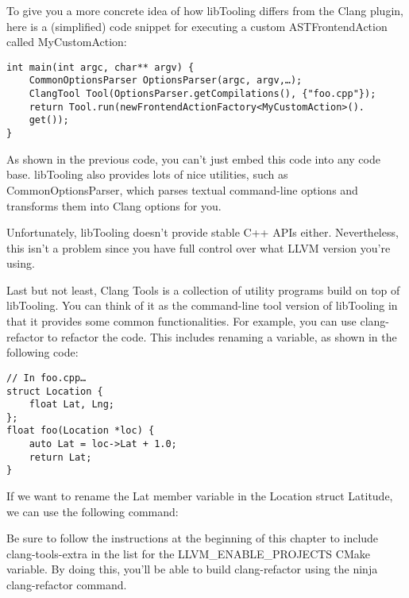 To give you a more concrete idea of how libTooling differs from the Clang plugin, here is a (simplified) code snippet for executing a custom ASTFrontendAction called MyCustomAction:

\begin{lstlisting}[style=styleCXX]
int main(int argc, char** argv) {
	CommonOptionsParser OptionsParser(argc, argv,…);
	ClangTool Tool(OptionsParser.getCompilations(), {"foo.cpp"});
	return Tool.run(newFrontendActionFactory<MyCustomAction>().
	get());
}
\end{lstlisting}

As shown in the previous code, you can't just embed this code into any code base. libTooling also provides lots of nice utilities, such as CommonOptionsParser, which parses textual command-line options and transforms them into Clang options for you.

\begin{tcolorbox}[colback=blue!5!white,colframe=blue!75!black, fonttitle=\bfseries,title=libTooling's API Stability]
\hspace*{0.7cm}Unfortunately, libTooling doesn't provide stable C++ APIs either. Nevertheless, this isn't a problem since you have full control over what LLVM version you're using.
\end{tcolorbox}

Last but not least, Clang Tools is a collection of utility programs build on top of libTooling. You can think of it as the command-line tool version of libTooling in that it provides some common functionalities. For example, you can use clang-refactor to refactor the code. This includes renaming a variable, as shown in the following code:

\begin{lstlisting}[style=styleCXX]
// In foo.cpp…
struct Location {
	float Lat, Lng;
};
float foo(Location *loc) {
	auto Lat = loc->Lat + 1.0;
	return Lat;
}
\end{lstlisting}

If we want to rename the Lat member variable in the Location struct Latitude, we can use the following command:


\begin{tcolorbox}[colback=blue!5!white,colframe=blue!75!black, fonttitle=\bfseries,title=Building clang-refactor]
\hspace*{0.7cm}Be sure to follow the instructions at the beginning of this chapter to include clang-tools-extra in the list for the LLVM\_ENABLE\_PROJECTS CMake variable. By doing this, you'll be able to build clang-refactor using the ninja clang-refactor command.
\end{tcolorbox}

